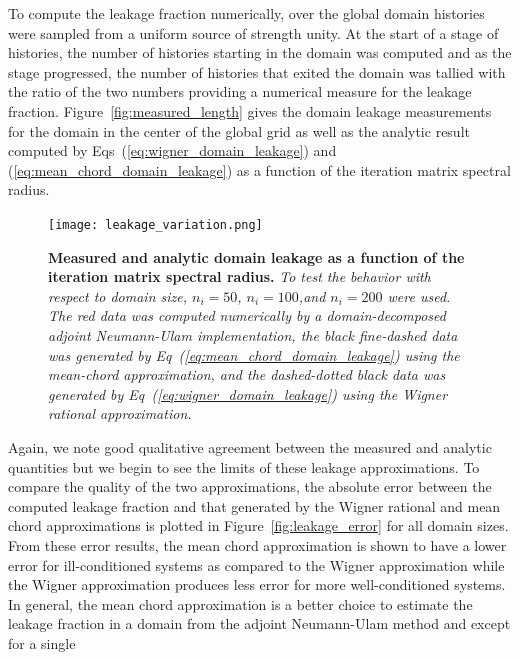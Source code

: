 \documentclass{mc2013}
\begin{document}
To compute the leakage fraction numerically, over the global domain
 histories were sampled from a uniform source of strength
unity. At the start of a stage of histories, the number of histories
starting in the domain was computed and as the stage progressed, the
number of histories that exited the domain was tallied with the ratio
of the two numbers providing a numerical measure for the leakage
fraction. Figure~\ref{fig:measured_length} gives the domain leakage
measurements for the domain in the center of the global grid as well
as the analytic result computed by
Eqs~(\ref{eq:wigner_domain_leakage}) and
(\ref{eq:mean_chord_domain_leakage}) as a function of the iteration
matrix spectral radius.
\vspace{16pt}
\begin{figure}[ht!]
\begin{spacing}{1.0}
  \begin{center}
    \texttt{[image: leakage\_variation.png]}
  \end{center}
  \caption{\textbf{Measured and analytic domain leakage as a function
      of the iteration matrix spectral radius.} \textit{To test the
      behavior with respect to domain size, $n_i=50$, $n_i=100$,and
      $n_i=200$ were used. The red data was computed numerically by a
      domain-decomposed adjoint Neumann-Ulam implementation, the black
      fine-dashed data was generated by
      Eq~(\ref{eq:mean_chord_domain_leakage}) using the mean-chord
      approximation, and the dashed-dotted black data was generated by
      Eq~(\ref{eq:wigner_domain_leakage}) using the Wigner rational
      approximation.}}
  \label{fig:measured_leakage}
\end{spacing}
\end{figure}
\vspace{16pt}
 Again, we note good qualitative agreement between the measured and
 analytic quantities but we begin to see the limits of these leakage
 approximations. To compare the quality of the two approximations, the
 absolute error between the computed leakage fraction and that
 generated by the Wigner rational and mean chord approximations is
 plotted in Figure~\ref{fig:leakage_error} for all domain sizes. From
 these error results, the mean chord approximation is shown to have a
 lower error for ill-conditioned systems as compared to the Wigner
 approximation while the Wigner approximation produces less error for
 more well-conditioned systems. In general, the mean chord
 approximation is a better choice to estimate the leakage fraction in
 a domain from the adjoint Neumann-Ulam method and except for a single
\end{document}
